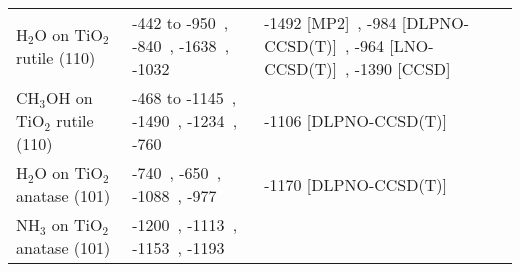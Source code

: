 \begin{table}
\begin{adjustbox}{center}
\begin{tabular}{lp{7cm}p{7cm}}
H$_2$O on TiO$_2$ rutile (110) & -442 to -950~\cite{kubasSurfaceAdsorptionEnergetics2016c}, -840~\cite{liuStructureDynamicsLiquid2010a}, -1638~\cite{banduraAdsorptionWaterTiO22004a}, -1032~\cite{sorescuCoadsorptionPropertiesCO22012} & -1492 [MP2]~\cite{stefanovichInitioStudyWater1999}, -984 [DLPNO-CCSD(T)]~\cite{kubasSurfaceAdsorptionEnergetics2016c}, -964 [LNO-CCSD(T)]~\cite{yeInitioSurfaceChemistry2024}, -1390 [CCSD]~\cite{schaferLocalEmbeddingCoupled2021b} \\
CH$_3$OH on TiO$_2$ rutile (110) & -468 to -1145~\cite{kubasSurfaceAdsorptionEnergetics2016c}, -1490~\cite{kieuTrendsAdsorptionEnergy2002}, -1234~\cite{batesAdsorptionDissociationROH1998}, -760~\cite{langFirstPrinciplesStudyMethanol2014} & -1106 [DLPNO-CCSD(T)]~\cite{kubasSurfaceAdsorptionEnergetics2016c} \\
H$_2$O on TiO$_2$ anatase (101) & -740~\cite{vittadiniStructureEnergeticsWater1998}, -650~\cite{millerEffectsWaterFormic2011}, -1088~\cite{onalAdsorptionWaterAmmonia2006}, -977~\cite{zhaoStructurePropertiesWater2012} & -1170 [DLPNO-CCSD(T)]~\cite{petersenWaterAdsorptionIdeal2020} \\
NH$_3$ on TiO$_2$ anatase (101) & -1200~\cite{koustNH3AdsorptionAnataseTiO22018a}, -1113~\cite{onalAdsorptionWaterAmmonia2006}, -1153~\cite{wanbayorAdsorptionCOH22010}, -1193~\cite{changAdsorptionConfigurationDissociative2009} &  \\
\bottomrule
\end{tabular}
\end{adjustbox}

\end{table}